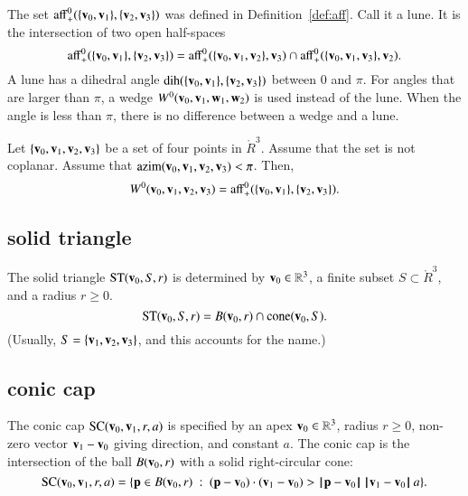 The set $\op{aff}^0_+(\{\v_0,\v_1\},\{\v_2,\v_3\})$ was defined
in Definition~\ref{def:aff}.  Call it a lune.  It is the intersection
of two open half-spaces
    $$
    \op{aff}^0_+(\{\v_0,\v_1\},\{\v_2,\v_3\})
    =\op{aff}^0_+(\{\v_0,\v_1,\v_2\},\v_3)\cap
    \op{aff}^0_+(\{\v_0,\v_1,\v_3\},\v_2).
        $$
A lune has a dihedral angle $\dih(\{\v_0,\v_1\},\{\v_2,\v_3\})$ between
$0$ and $\pi$.   For angles that are larger than $\pi$,   a wedge
$W^0(\v_0,\v_1,\w_1,\w_2)$ is used instead of the lune.  
When the angle is less than $\pi$, there is no difference between
a wedge and a lune.
%
%
%
%
%
%

\begin{lemma} Let $\{\v_0,\v_1,\v_2,\v_3\}$ be a set of four points
in $\ring{R}^3$.  Assume that the set is not coplanar.
Assume that $\op{azim}(\v_0,\v_1,\v_2,\v_3)<\pi$.
Then,
   $$W^0(\v_0,\v_1,\v_2,\v_3) = \op{aff}^0_+(\{\v_0,\v_1\},\{\v_2,\v_3\}).$$
%
\end{lemma}


\subsection{solid triangle}
%

\begin{definition} The solid triangle $\op{ST}(\v_0,S,r)$ is
determined by  $\v_0\in\ring{R}^3$, a finite subset $S\subset\ring{R}^3$,
and a radius $r\ge0$. 
    $$
    \op{ST}(\v_0,S,r) = 
    B(\v_0,r)\cap \op{cone}(\v_0,S).
    $$
(Usually, $S=\{\v_1,\v_2,\v_3\}$, and this accounts for
the name.)
%
%
%
\end{definition}



\subsection{conic cap}
%


\begin{definition}
The conic cap $\op{SC}(\v_0,\v_1,r,a)$ is specified by an apex
$\v_0\in\ring{R}^3$,  radius $r\ge0$,  non-zero vector $\v_1-\v_0$ giving
direction, and constant $a$.  The conic cap is the intersection of
the ball $B(\v_0,r)$ with a solid right-circular cone:
    $$
    \op{SC}(\v_0,\v_1,r,a)=\{\p \in B(\v_0,r) \mid (\p-\v_0)\cdot (\v_1-\v_0) > \norm{\p}{\v_0}\, \norm{\v_1}{\v_0}\, a\}.
    $$
%
%
%
%
\end{definition}

